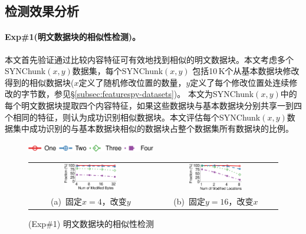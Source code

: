 \subsection{检测效果分析}
\label{subsec:featurespy-evaluation-detection}

\paragraph*{Exp\#1(明文数据块的相似性检测)。}本文首先验证通过比较内容特征可有效地找到相似的明文数据块。本文考虑多个SYNChunk$(x, y)$数据集，每个SYNChunk$(x, y)$ 包括10\,K个从基本数据块修改得到的相似数据块($x$定义了随机修改位置的数量，$y$定义了每个修改位置处连续修改的字节数，参见\S\ref{subsec:featurespy-datasets})。 本文为SYNChunk$(x, y)$中的每个明文数据块提取四个内容特征，如果这些数据块与基本数据块分别共享一到四个相同的特征，则认为成功识别相似数据块。本文评估每个SYNChunk$(x, y)$数据集中成功识别的与基本数据块相似的数据块占整个数据集所有数据块的比例。

\begin{figure}[!htb]
    \centering
    \includegraphics[width=0.5\textwidth]{pic/featurespy/plot/detection/syn/fixed_pq_legend.pdf}
    \vspace{5pt}\\
    \begin{tabular}{@{\ }c@{\ }c}
        \includegraphics[width=0.45\textwidth]{pic/featurespy/plot/detection/syn/fixed_p_4.pdf} &
        \includegraphics[width=0.45\textwidth]{pic/featurespy/plot/detection/syn/fixed_q_16.pdf}  \\
        \mbox{\small (a) 固定$x=4$，改变$y$}                                                    &
        \mbox{\small (b) 固定$y=16$，改变$x$}                                                     \\
    \end{tabular}
    \caption{(Exp\#1) 明文数据块的相似性检测}
    \label{fig:featurespy-expDetectionSynSim}
\end{figure}

